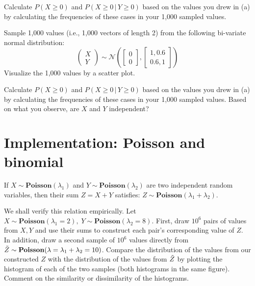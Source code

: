 \documentclass[11pt]{article}
\begin{document}
\item {} Calculate $P(X \geq 0)$ and $P(X \geq 0\, \vert\, Y \geq 0)$ based on the values you drew in (a) by calculating the frequencies of these cases in your 1,000 sampled values.
\ifnotsolution{\clearpage}


\item {}
Sample 1,000 values (i.e., 1,000 vectors of length 2) from the following bi-variate normal distribution:
$$\begin{pmatrix}X \\ Y\end{pmatrix} \sim \mathcal{N} \left(\begin{bmatrix}0 \\ 0\end{bmatrix}, \begin{bmatrix}1,0.6 \\ 0.6,1 \end{bmatrix} \right)$$ Visualize the 1,000 values by a scatter plot.
\ifnotsolution{\vspace{10cm}}


\item {} 
Calculate $P(X \geq 0)$ and $P(X \geq 0\, \vert\, Y \geq 0)$ based on the values you drew in (a) by calculating the frequencies of these cases in your 1,000 sampled values.
Based on what you observe, are $X$ and $Y$ independent? 
\ifnotsolution{\clearpage}

\ee



\section{Implementation: Poisson and binomial }
\be
\item {} If $X \sim \textbf{Poisson} (\lambda_1)$ and $Y \sim \textbf{Poisson} (\lambda_2)$ are two independent random variables, then their sum $Z = X+Y$ satisfies: $Z\sim \textbf{Poisson} (\lambda_1 + \lambda_2)$.

We shall verify this relation empirically. Let $X\sim \textbf{Poisson}(\lambda_1 = 2), \; Y\sim \textbf{Poisson}(\lambda_2 = 8)$. First, draw $10^{6}$ pairs of values from $X,Y$ and use their sums to construct each pair's corresponding value of $Z$. In addition, draw a second sample of $10^6$ values directly from $\Tilde{Z} \sim \textbf{Poisson}(\lambda = \lambda_1+ \lambda_2 = 10)$. Compare the distribution of the values from our constructed $Z$ with the distribution of the values from $\Tilde{Z}$ by plotting the histogram of each of the two samples (both histograms in the same figure). Comment on the similarity or dissimilarity of the histograms.
\ifnotsolution{\clearpage}
\end{document}
